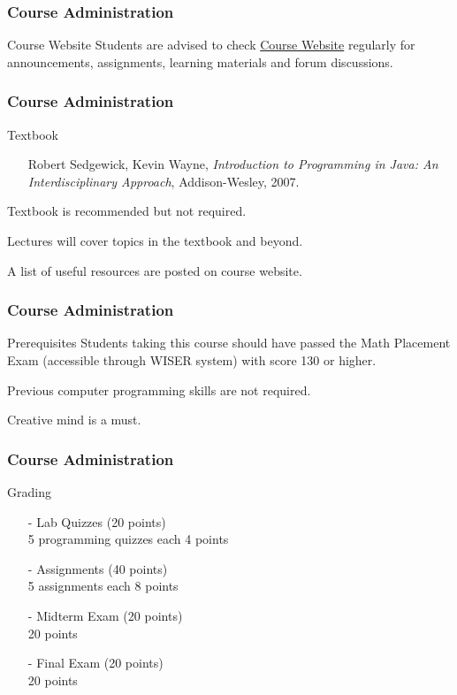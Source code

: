 \documentclass[10pt, compress]{beamer}
\begin{document}
\begin{frame}
	\frametitle{Course Administration}
	\begin{block}{Course Website}
		Students are advised to check \href{http://www.ghorbanzade.com/?tab=5&course=1}{\alert{Course Website}} regularly for announcements, assignments, learning materials and forum discussions.
	\end{block}
\end{frame}

\begin{frame}
	\frametitle{Course Administration}
	\begin{block}{Textbook}
		\begin{itemize}
			\item[] Robert Sedgewick, Kevin Wayne, \emph{Introduction to Programming in Java: An Interdisciplinary Approach}, Addison-Wesley, 2007.
		\end{itemize}
		Textbook is recommended but not required.

		Lectures will cover topics in the textbook and beyond.

		A list of useful resources are posted on course website.
	\end{block}
\end{frame}

\begin{frame}
	\frametitle{Course Administration}
	\begin{block}{Prerequisites}
		Students taking this course should have passed the Math Placement Exam (accessible through WISER system) with score 130 or higher.

		Previous computer programming skills are not required.

		Creative mind is a must.
	\end{block}
\end{frame}

\begin{frame}
	\frametitle{Course Administration}
	\begin{block}{Grading}
		\begin{itemize}
			\item[-] Lab Quizzes (20 points)\\5 programming quizzes each 4 points
			\item[-] Assignments (40 points)\\5 assignments each 8 points
			\item[-] Midterm Exam (20 points)\\20 points
			\item[-] Final Exam (20 points)\\20 points
		\end{itemize}
	\end{block}
\end{frame}
\end{document}
